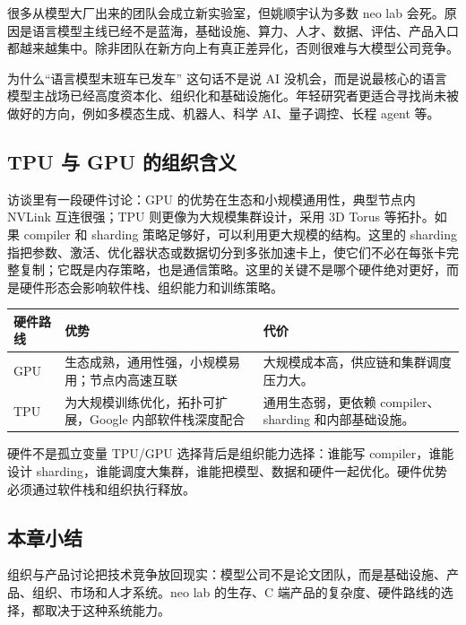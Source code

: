 \documentclass[a4paper]{article}
\begin{document}
很多从模型大厂出来的团队会成立新实验室，但姚顺宇认为多数 neo lab 会死。原因是语言模型主线已经不是蓝海，基础设施、算力、人才、数据、评估、产品入口都越来越集中。除非团队在新方向上有真正差异化，否则很难与大模型公司竞争。

\begin{knowledgebox}{为什么“语言模型末班车已发车”}
这句话不是说 AI 没机会，而是说最核心的语言模型主战场已经高度资本化、组织化和基础设施化。年轻研究者更适合寻找尚未被做好的方向，例如多模态生成、机器人、科学 AI、量子调控、长程 agent 等。
\end{knowledgebox}

\subsection{TPU 与 GPU 的组织含义}

访谈里有一段硬件讨论：GPU 的优势在生态和小规模通用性，典型节点内 NVLink 互连很强；TPU 则更像为大规模集群设计，采用 3D Torus 等拓扑。如果 compiler 和 sharding 策略足够好，可以利用更大规模的结构。这里的 sharding 指把参数、激活、优化器状态或数据切分到多张加速卡上，使它们不必在每张卡完整复制；它既是内存策略，也是通信策略。这里的关键不是哪个硬件绝对更好，而是硬件形态会影响软件栈、组织能力和训练策略。

\noindent\begin{tabularx}{\textwidth}{p{}p{}X}
\toprule
硬件路线 & 优势 & 代价 \\
\midrule
GPU & 生态成熟，通用性强，小规模易用；节点内高速互联 & 大规模成本高，供应链和集群调度压力大。 \\
TPU & 为大规模训练优化，拓扑可扩展，Google 内部软件栈深度配合 & 通用生态弱，更依赖 compiler、sharding 和内部基础设施。 \\
\bottomrule
\end{tabularx}

\begin{importantbox}{硬件不是孤立变量}
TPU/GPU 选择背后是组织能力选择：谁能写 compiler，谁能设计 sharding，谁能调度大集群，谁能把模型、数据和硬件一起优化。硬件优势必须通过软件栈和组织执行释放。
\end{importantbox}

\subsection{本章小结}

组织与产品讨论把技术竞争放回现实：模型公司不是论文团队，而是基础设施、产品、组织、市场和人才系统。neo lab 的生存、C 端产品的复杂度、硬件路线的选择，都取决于这种系统能力。
\end{document}
